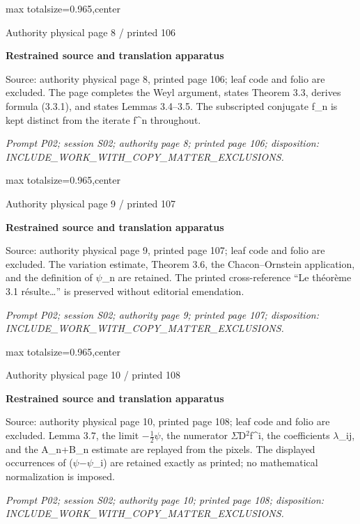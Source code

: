 \documentclass{article}
\begin{document}
\newpage
\noindent\begin{adjustbox}{max totalsize={\textwidth}{0.965\textheight},center}\begin{minipage}{\textwidth}
\noindent\hfill\scriptsize Authority physical page 8 / printed 106\par\normalsize
\textbf{Restrained source and translation apparatus}\par
Source: authority physical page 8, printed page 106; leaf code and folio are excluded. The page completes the Weyl argument, states Theorem 3.3, derives formula (3.3.1), and states Lemmas 3.4–3.5. The subscripted conjugate f\_n is kept distinct from the iterate f\textasciicircum{}n throughout.
\par\smallskip
\textit{Prompt P02; session S02; authority page 8; printed page 106; disposition: INCLUDE\_WORK\_WITH\_COPY\_MATTER\_EXCLUSIONS.}
\end{minipage}\end{adjustbox}

\newpage
\noindent\begin{adjustbox}{max totalsize={\textwidth}{0.965\textheight},center}\begin{minipage}{\textwidth}
\noindent\hfill\scriptsize Authority physical page 9 / printed 107\par\normalsize
\textbf{Restrained source and translation apparatus}\par
Source: authority physical page 9, printed page 107; leaf code and folio are excluded. The variation estimate, Theorem 3.6, the Chacon–Ornstein application, and the definition of \ensuremath{\psi}\_n are retained. The printed cross-reference “Le théorème 3.1 résulte…” is preserved without editorial emendation.
\par\smallskip
\textit{Prompt P02; session S02; authority page 9; printed page 107; disposition: INCLUDE\_WORK\_WITH\_COPY\_MATTER\_EXCLUSIONS.}
\end{minipage}\end{adjustbox}

\newpage
\noindent\begin{adjustbox}{max totalsize={\textwidth}{0.965\textheight},center}\begin{minipage}{\textwidth}
\noindent\hfill\scriptsize Authority physical page 10 / printed 108\par\normalsize
\textbf{Restrained source and translation apparatus}\par
Source: authority physical page 10, printed page 108; leaf code and folio are excluded. Lemma 3.7, the limit \ensuremath{-}\ensuremath{\tfrac{1}{2}}\ensuremath{\psi}, the numerator \ensuremath{\Sigma}D\ensuremath{{}^{2}}f\textasciicircum{}i, the coefficients \ensuremath{\lambda}\_ij, and the A\_n+B\_n estimate are replayed from the pixels. The displayed occurrences of (\ensuremath{\psi}\ensuremath{-}\ensuremath{\psi}\_i) are retained exactly as printed; no mathematical normalization is imposed.
\par\smallskip
\textit{Prompt P02; session S02; authority page 10; printed page 108; disposition: INCLUDE\_WORK\_WITH\_COPY\_MATTER\_EXCLUSIONS.}
\end{minipage}\end{adjustbox}
\end{document}
